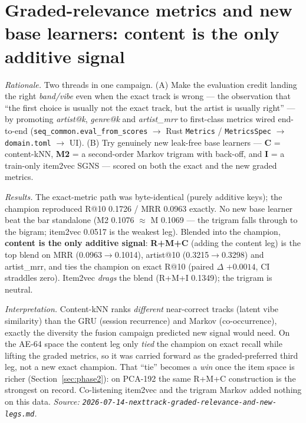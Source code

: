 \documentclass[11pt]{article}
\begin{document}
\section{Graded-relevance metrics and new base learners: content is the only additive signal}
\label{sec:graded}
\emph{Rationale.} Two threads in one campaign. (A) Make the evaluation credit
landing the right \emph{band/vibe} even when the exact track is wrong --- the
observation that ``the first choice is usually not the exact track, but the
artist is usually right'' --- by promoting \emph{artist@k}, \emph{genre@k} and
\emph{artist\_mrr} to first-class metrics wired end-to-end
(\texttt{seq\_common.eval\_from\_scores} $\to$ Rust \texttt{Metrics} /
\texttt{MetricsSpec} $\to$ \texttt{domain.toml} $\to$ UI). (B) Try genuinely new
leak-free base learners --- \textbf{C} = content-kNN, \textbf{M2} = a
second-order Markov trigram with back-off, and \textbf{I} = a train-only
item2vec SGNS --- scored on both the exact and the new graded metrics.

\emph{Results.} The exact-metric path was byte-identical (purely additive keys);
the champion reproduced R@10 \num{0.1726} / MRR \num{0.0963} exactly. No new base
learner beat the bar standalone (M2 \num{0.1076} $\approx$ M \num{0.1069} --- the
trigram falls through to the bigram; item2vec \num{0.0517} is the weakest leg).
Blended into the champion, \textbf{content is the only additive signal}:
\textbf{R+M+C} (adding the content leg) is the top blend on MRR
(\num{0.0963}$\to$\num{0.1014}), artist@10 (\num{0.3215}$\to$\num{0.3298}) and
artist\_mrr, and ties the champion on exact R@10 (paired $\Delta$
$+\num{0.0014}$, CI straddles zero). Item2vec \emph{drags} the blend (R+M+I
\num{0.1349}); the trigram is neutral.

\emph{Interpretation.} Content-kNN ranks \emph{different} near-correct tracks
(latent vibe similarity) than the GRU (session recurrence) and Markov
(co-occurrence), exactly the diversity the fusion campaign predicted new signal
would need. On the AE-64 space the content leg only \emph{tied} the champion on
exact recall while lifting the graded metrics, so it was carried forward as the
graded-preferred third leg, not a new exact champion. That ``tie'' becomes a
\emph{win} once the item space is richer (Section~\ref{sec:phase2}): on PCA-192
the same R+M+C construction is the strongest on record. Co-listening item2vec and
the trigram Markov added nothing on this data.
\emph{Source: \texttt{2026-07-14-nexttrack-graded-relevance-and-new-legs.md}.}
\end{document}
